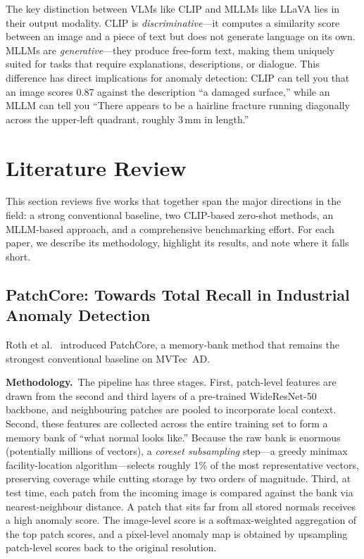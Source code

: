 \documentclass[conference]{IEEEtran}
\begin{document}
The key distinction between VLMs like CLIP and MLLMs like LLaVA lies in their output modality. CLIP is \textit{discriminative}---it computes a similarity score between an image and a piece of text but does not generate language on its own. MLLMs are \textit{generative}---they produce free-form text, making them uniquely suited for tasks that require explanations, descriptions, or dialogue. This difference has direct implications for anomaly detection: CLIP can tell you that an image scores 0.87 against the description ``a damaged surface,'' while an MLLM can tell you ``There appears to be a hairline fracture running diagonally across the upper-left quadrant, roughly 3\,mm in length.''

\section{Literature Review}

This section reviews five works that together span the major directions in the field: a strong conventional baseline, two CLIP-based zero-shot methods, an MLLM-based approach, and a comprehensive benchmarking effort. For each paper, we describe its methodology, highlight its results, and note where it falls short.

\subsection{PatchCore: Towards Total Recall in Industrial Anomaly Detection}

Roth et al.~\cite{roth2022patchcore} introduced PatchCore, a memory-bank method that remains the strongest conventional baseline on MVTec~AD.

\textbf{Methodology.}\ The pipeline has three stages. First, patch-level features are drawn from the second and third layers of a pre-trained WideResNet-50 backbone, and neighbouring patches are pooled to incorporate local context. Second, these features are collected across the entire training set to form a memory bank of ``what normal looks like.'' Because the raw bank is enormous (potentially millions of vectors), a \textit{coreset subsampling} step---a greedy minimax facility-location algorithm---selects roughly 1\% of the most representative vectors, preserving coverage while cutting storage by two orders of magnitude. Third, at test time, each patch from the incoming image is compared against the bank via nearest-neighbour distance. A patch that sits far from all stored normals receives a high anomaly score. The image-level score is a softmax-weighted aggregation of the top patch scores, and a pixel-level anomaly map is obtained by upsampling patch-level scores back to the original resolution.
\end{document}
